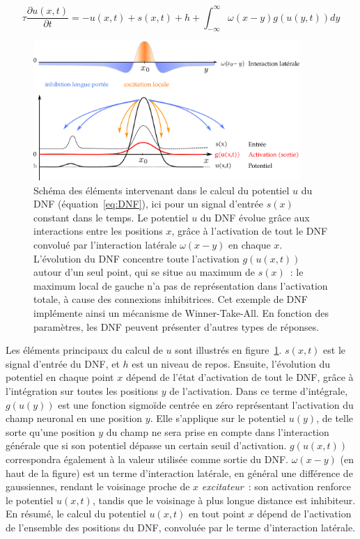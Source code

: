 \documentclass[../main]{subfiles}
\begin{document}
\begin{equation}\label{eq:DNF}
	\tau \frac{\partial u(x,t)}{\partial t} = - u(x,t) + s(x,t) + h + \int_{-\infty}^{\infty} \omega(x - y)g(u(y,t))dy 
\end{equation}

\begin{figure}
	\centering\includegraphics[width=0.9\textwidth]{DNF.pdf}
	\caption{Schéma des éléments intervenant dans le calcul du potentiel $u$ du DNF (équation~\ref{eq:DNF}), ici pour un signal d'entrée $s(x)$ constant dans le temps.
	Le potentiel $u$ du DNF évolue grâce aux interactions entre les positions $x$, grâce à l'activation de tout le DNF convolué par l'interaction latérale $\omega(x - y)$ en chaque $x $.
	L'évolution du DNF concentre toute l'activation $g(u(x,t))$ autour d'un seul point, qui se situe au maximum de $s(x)$~: le maximum local de gauche n'a pas de représentation dans l'activation totale, à cause des connexions inhibitrices.
	Cet exemple de DNF implémente ainsi un mécanisme de Winner-Take-All. En fonction des paramètres, les DNF peuvent présenter d'autres types de réponses. \label{fig:DNF}
	}
\end{figure}

Les éléments principaux du calcul de $u$ sont illustrés en figure~\ref{fig:DNF}.
$s(x,t)$ est le signal d'entrée du DNF, et $h$ est un niveau de repos.
Ensuite, l'évolution du potentiel en chaque point $x$ dépend de l'état d'activation de tout le DNF, grâce à l'intégration sur toutes les positions $y$ de l'activation.
Dans ce terme d'intégrale, $g(u(y))$ est une fonction sigmoïde centrée en zéro représentant l'activation du champ neuronal en une position $y$. Elle s'applique sur le potentiel $u(y)$, de telle sorte qu'une position $y$ du champ ne sera prise en compte dans l'interaction générale que si son potentiel dépasse un certain seuil d'activation. $g(u(x,t))$ correspondra également à la valeur utilisée comme sortie du DNF.
$\omega(x-y)$ (en haut de la figure) est un terme d'interaction latérale, en général une différence de gaussiennes, rendant le voisinage proche de $x$ \emph{excitateur}~: son activation renforce le potentiel $u(x,t)$, tandis que le voisinage à plus longue distance est inhibiteur.
En résumé, le calcul du potentiel $u(x,t)$ en tout point $x$ dépend de l'activation de l'ensemble des positions du DNF, convoluée par le terme d'interaction latérale.
\end{document}
